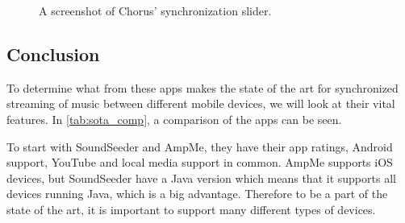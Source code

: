 \begin{figure}[h!]
\begin{minipage}[b]{0.45\textwidth}
        \caption{A screenshot of Chorus' synchronization slider.}\label{fig:chorus_slider}
    \end{minipage}
\end{figure}

\subsection{Conclusion}%
To determine what from these apps makes the state of the art for synchronized streaming of music between different mobile devices,
we will look at their vital features.
In \cref{tab:sota_comp}, a comparison of the apps can be seen. 

To start with SoundSeeder and AmpMe, they have their app ratings, Android support, YouTube and local media support in common.
AmpMe supports iOS devices, but SoundSeeder have a Java version which means that it supports all devices running Java, which is a big advantage. 
Therefore to be a part of the state of the art, it is important to support many different types of devices.

